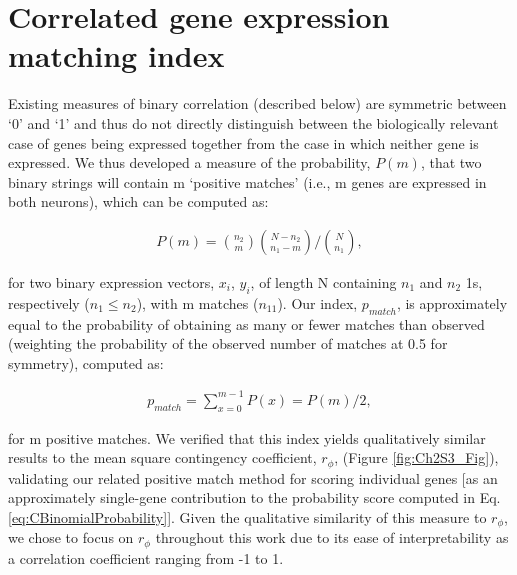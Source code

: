 \section{Correlated gene expression matching index}
\label{app:AppendixCh2_3}

Existing measures of binary correlation (described below) are symmetric between ‘0’ and ‘1’ and thus do not directly distinguish between the biologically relevant case of genes being expressed together from the case in which neither gene is expressed. We thus developed a measure of the probability, $P(m)$, that two binary strings will contain m ‘positive matches’ (i.e., m genes are expressed in both neurons), which can be computed as:


\begin{eqnarray}
	\label{eq:S3}
     P(m) = \binom{n_{2}}{m}\binom{N-n_{2}}{n_{1}-m}/\binom{N}{n_{1}},
\end{eqnarray}

for two binary expression vectors, $x_{i}$, $y_{i}$, of length N containing $n_{1}$ and $n_{2}$ 1s, respectively ($n_{1} \leq n_{2}$), with m matches ($n_{11}$). Our index, $p_{match}$, is approximately equal to the probability of obtaining as many or fewer matches than observed (weighting the probability of the observed number of matches at 0.5 for symmetry), computed as:

\begin{eqnarray}
	\label{eq:S4}
     p_{match} = \sum_{x=0}^{m-1}P(x)=P(m)/2,
\end{eqnarray}

for m positive matches.
	We verified that this index yields qualitatively similar results to the mean square contingency coefficient, $r_\phi$, (Figure \ref{fig:Ch2S3_Fig}), validating our related positive match method for scoring individual genes [as an approximately single-gene contribution to the probability score computed in Eq. \ref{eq:CBinomialProbability}].
Given the qualitative similarity of this measure to $r_\phi$, we chose to focus on $r_\phi$ throughout this work due to its ease of interpretability as a correlation coefficient ranging from -1 to 1.

